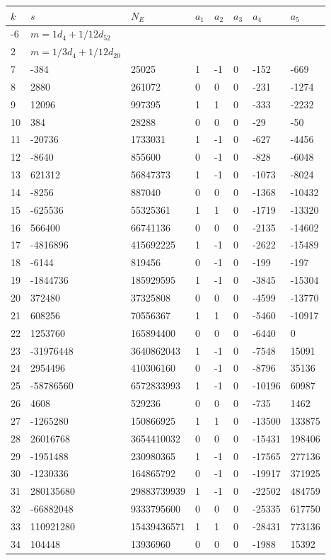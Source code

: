 \documentclass{amsart}
\begin{document}
\begin{longtable}{|l|l|l|lllll|}
\hline
$k$ & $s$ & $N_E$ & $a_1$ & $a_2$ & $a_3$ & $a_4$ & $a_5$\\
\hline
-6&$m=1d_{4}+1/12d_{52}$&&\multicolumn{5}{c|}{}\\
2&$m=1/3d_{4}+1/12d_{20}$&&\multicolumn{5}{c|}{}\\
7&-384&25025&1&-1&0&-152&-669\\
8&2880&261072&0&0&0&-231&-1274\\
9&12096&997395&1&1&0&-333&-2232\\
10&384&28288&0&0&0&-29&-50\\
11&-20736&1733031&1&-1&0&-627&-4456\\
12&-8640&855600&0&-1&0&-828&-6048\\
13&621312&56847373&1&-1&0&-1073&-8024\\
14&-8256&887040&0&0&0&-1368&-10432\\
15&-625536&55325361&1&1&0&-1719&-13320\\
16&566400&66741136&0&0&0&-2135&-14602\\
17&-4816896&415692225&1&-1&0&-2622&-15489\\
18&-6144&819456&0&-1&0&-199&-197\\
19&-1844736&185929595&1&-1&0&-3845&-15304\\
20&372480&37325808&0&0&0&-4599&-13770\\
21&608256&70556367&1&1&0&-5460&-10917\\
22&1253760&165894400&0&0&0&-6440&0\\
23&-31976448&3640862043&1&-1&0&-7548&15091\\
24&2954496&410306160&0&-1&0&-8796&35136\\
25&-58786560&6572833993&1&-1&0&-10196&60987\\
26&4608&529236&0&0&0&-735&1462\\
27&-1265280&150866925&1&1&0&-13500&133875\\
28&26016768&3654410032&0&0&0&-15431&198406\\
29&-1951488&230980365&1&-1&0&-17565&277136\\
30&-1230336&164865792&0&-1&0&-19917&371925\\
31&280135680&29883739939&1&-1&0&-22502&484759\\
32&-66882048&9333795600&0&0&0&-25335&617750\\
33&110921280&15439436571&1&1&0&-28431&773136\\
34&104448&13936960&0&0&0&-1988&15392\\

\end{longtable}
\end{document}
